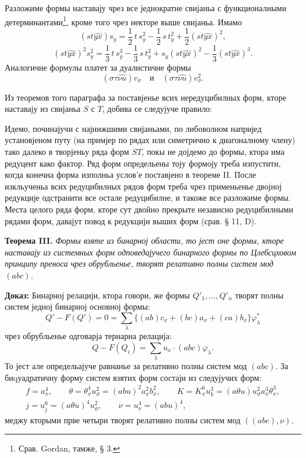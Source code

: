 ﻿\documentclass[11pt]{article}
\begin{document}
Разложиме формы наставају чрез все једнократне свијаньа с функционалными детерминантами\footnote{Срав. Gordan, тамже, § 3.}, кроме того чрез некторе выше свијаньа. Имамо
\[
(st\widehat{yx})s_y=\frac12\,t\,s_y^2-\frac12\,s\,t_y^2+\frac12(st\widehat{yx})^2,
\]
\[
(st\widehat{yx})^2s_y^2=\frac13\,t\,s_y^3-\frac13\,s\,t_y^3+s_y(st\widehat{yx})^2-\frac13(st\widehat{yx})^3.
\]
Аналогичне формулы платет за дуалистичне формы
\[
(\sigma\tau\widehat{\nu u})v_\sigma
\quad\text{и}\quad
(\sigma\tau\widehat{\nu u})v_\sigma^2.
\]

Из теоремов того параграфа за поставјенье всих нередуцибилных форм, кторе наставају из свијаньа $S$ с $T$, добива се следујуче правило:

Идемо, починајучи с најнижшими свијаньами, по либоволном напријед установјеном путу (на примјер по рядах или симетрично к диагоналному члену) тако далеко в творјеньу ряда форм $ST$, покы не дојдемо до формы, ктора има редуцент како фактор. Ряд форм определьены тоју формоју треба изпустити, когда конечна форма изполньа услов’е поставјено в теореме II. После изкльученьа всих редуцибилных рядов форм треба чрез применьенье двојној редукције одстранити все остале редуцибилне, и такоже все разложиме формы. Места целого ряда форм, кторе сут двойно прекрыте независно редуцибилными рядами форм, давајут повод к редукцији выших форм (срав. § 11, D).

\clearpage
\noindent\textbf{Теорема III.}
{\itshape Формы взяте из бинарној области, то јест оне формы, кторе наставају из системных форм одповедајучего бинарного формы по Цлебсцховом принципу преноса чрез обрубльенье, творят релативно полны систем мод $(abc)$.}

\noindent\textbf{Доказ:}
Бинарној релацији, ктора говори, же формы $Q'_1,\ldots,Q'_n$ творят полны систем једној бинарној основној формы:
\[
Q'-F(Q')=0=\sum_\lambda\bigl\{(ab)c_x+(bc)a_x+(ca)b_x\bigr\}\varphi_\lambda^{*}
\]
чрез обрубльенье одговарја тернарна релација:
\[
Q-F(Q_i)=\sum_\lambda u_x\cdot(abc)\varphi_\lambda .
\]
То јест але определьајуче равнанье за релативно полны систем мод $(abc)$. За биqуадратичну форму систем взятих форм состаји из следујучих форм:
\[
\begin{gathered}
f=a_x^4,\qquad
\theta=\theta_x^4u_\vartheta^2=(abu)^2a_x^2b_x^2,\qquad
K=K_x^6u_k^3=(a\theta u)u_\vartheta^2a_x^3\theta_x^3,\\
j=u_j^6=(a\theta u)^4u_\vartheta^2,\qquad
\nu=u_\nu^4=(abu)^4,
\end{gathered}
\]
меджу кторыми прве четыри творят релативно полны систем мод $((abc),\nu)$.
\end{document}
